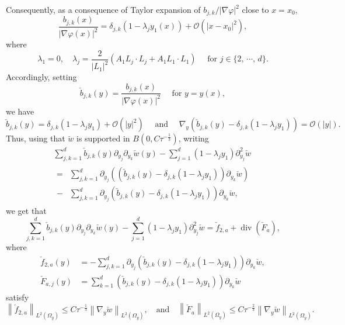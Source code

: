 \documentclass[AHL,Unicode,longabstracts]{cedram}
\newcommand{\clO}{\mathcal{O}}
\renewcommand{\leq}{\leqslant}
\renewcommand{\div}{\operatorname{div}}
\begin{document}
Consequently, as a consequence of Taylor expansion of $b_{j,k}/|\nabla \varphi|^2$ close to $x = x_0$,
\[
\frac{b_{j,k}(x)}{|\nabla \varphi(x)|^2} =
\delta_{j,k}\left(1 - \lambda_j y_1(x)\right)+ \clO\left(|x-x_0|^2\right),
\]
where
\begin{equation}\label{Link-Lambda-j-Pseudo}
\lambda_1 = 0, \quad \lambda_j = \frac{2}{|L_1|^2} (A_1 L_j \cdot L_j + A_1 L_1 \cdot L_1) \quad \text{ for } j \in \{2,\, \cdots,\, d\}.
\end{equation}
Accordingly, setting
\[
\check b_{j,k}(y) = \frac{b_{j,k}(x)}{|\nabla \varphi(x)|^2} \quad \text{ for } y = y(x),
\]
we have
\[
\check b_{j,k}(y) = \delta_{j,k} (1- \lambda_j y_1) + \clO(|y|^2)
\quad \text{ and } \quad
\nabla_y \left(\check b_{j,k}(y)- \delta_{j,k} \left(1-\lambda_j y_1\right)\right) = \clO(|y|).
\]
Thus, using that $\check w$ is supported in $B(0, C \tau^{-\frac{1}{3}})$, writing
\begin{multline*}
\sum_{j,k = 1}^d \check b_{j,k}(y) \partial_{y_j} \partial_{y_k} \check w(y) -
\sum_{j = 1}^d (1 - \lambda_j y_1) \partial_{y_j}^2 \check w
\\
\begin{aligned}
=
&\sum_{j,k = 1}^d \partial_{y_j} \left(\left(\check b_{j,k}(y) - \delta_{j,k} (1 - \lambda_j y_1) \right) \partial_{y_{k}} \check w \right) \\
-
&\sum_{j,k = 1}^d \partial_{y_j} \left(\check b_{j,k}(y)- \delta_{j,k} \left(1-\lambda_j y_1\right)\right) \partial_{y_{k}} \check w,
\end{aligned}
\end{multline*}
we get that
\[
\sum_{j,k = 1}^d \check b_{j,k}(y) \partial_{y_j} \partial_{y_k} \check w(y) -
\sum_{j = 1}^d \left(1 - \lambda_j y_1\right) \partial_{y_j}^2 \check w =
\check f_{2,a} + \div\left(\check F_a\right),
\]
where
\begin{align*}
\check f_{2,a} (y) &= -
\sum_{j,k = 1}^d \partial_{y_j} \left(\check b_{j,k}(y)- \delta_{j,k} \left(1-\lambda_j y_1\right)\right) \partial_{y_{k}} \check w,
\\
\check F_{a,j}(y) &= \sum_{k = 1}^d \left(\check b_{j,k}(y) - \delta_{j,k} \left(1 - \lambda_j y_1\right) \right) \partial_{y_{k}} \check w
\end{align*}
satisfy
\begin{equation*}
\left\| \check f_{2,a} \right\|_{L^2(\Omega_y)} \leq C \tau^{-\frac{1}{3}} \left\| \nabla_y \check w\right\|_{L^2(\Omega_y)},
\quad \text{and} \quad
\left\| \check F_a\right\|_{L^2(\Omega_y)} \leq C \tau^{-\frac{2}{3}} \left\| \nabla_y \check w\right\|_{L^2(\Omega_y)}.
\end{equation*}
\end{document}
